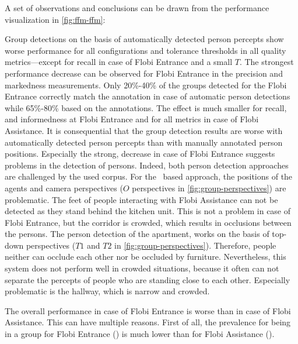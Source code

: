 A set of observations and conclusions can be drawn from the performance visualization in \cref{fig:ffm-ffm}:
\begin{enumerate*}[label=(\roman*)]
    \item Group detections on the basis of automatically detected person percepts show worse performance for all configurations and \glspl{tolerance threshold} in all quality metrics---except for \gls{recall} in case of \gls{Flobi Entrance} and a small \(T\).
    The strongest performance decrease can be observed for \gls{Flobi Entrance} in the \gls{precision} and \gls{markedness} measurements.
    Only 20\%-40\% of the groups detected for the \gls{Flobi Entrance} correctly match the annotation in case of automatic person detections while 65\%-80\% based on the annotations.
    The effect is much smaller for \gls{recall}, and \gls{informedness} at \gls{Flobi Entrance} and for all metrics in case of \gls{Flobi Assistance}.
    It is consequential that the group detection results are worse with automatically detected person percepts than with manually annotated person positions.
    Especially the strong, decrease in case of \gls{Flobi Entrance} suggests  problems in the detection of persons.
    Indeed, both person detection approaches are challenged by the used corpus.
    For the~ based approach, the positions of the agents and camera perspectives (\(O\) perspectives in \cref{fig:group-perspectives}) are problematic.
    The feet of people interacting with \gls{Flobi Assistance} can not be detected as they stand behind the kitchen unit.
    This is not a problem in case of \gls{Flobi Entrance}, but the corridor is crowded, which results in occlusions between the persons.
    The person detection of the \gls{apartment}, works on the basis of top-down perspectives (\(T1\) and \(T2\) in \cref{fig:group-perspectives}).
    Therefore, people neither can occlude each other nor be occluded by furniture.
    Nevertheless, this system does not perform well in crowded situations, because it often can not separate the percepts of people who are standing close to each other.
    Especially problematic is the hallway, which is narrow and crowded.
    \item The overall performance in case of \gls{Flobi Entrance} is worse than in case of \gls{Flobi Assistance}.
    This can have multiple reasons.
    First of all, the \gls{prevalence} for being in a group for \gls{Flobi Entrance} () is much lower than for \gls{Flobi Assistance} ().

\end{enumerate*}
